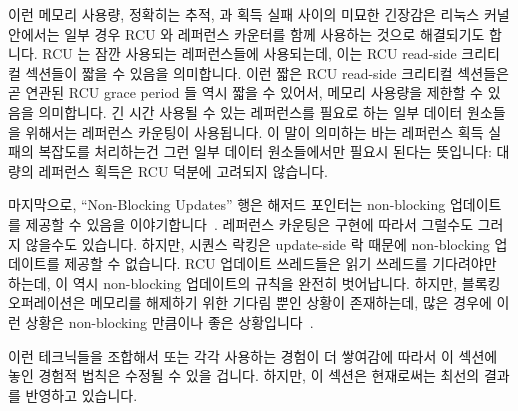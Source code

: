 이런 메모리 사용량, 정확히는 추적, 과 획득 실패 사이의 미묘한 긴장감은 리눅스
커널 안에서는 일부 경우 RCU 와 레퍼런스 카운터를 함께 사용하는 것으로
해결되기도 합니다.
RCU 는 잠깐 사용되는 레퍼런스들에 사용되는데, 이는 RCU read-side 크리티컬
섹션들이 짧을 수 있음을 의미합니다.
이런 짧은 RCU read-side 크리티컬 섹션들은 곧 연관된 RCU grace period 들 역시
짧을 수 있어서, 메모리 사용량을 제한할 수 있음을 의미합니다.
긴 시간 사용될 수 있는 레퍼런스를 필요로 하는 일부 데이터 원소들을 위해서는
레퍼런스 카운팅이 사용됩니다.
이 말이 의미하는 바는 레퍼런스 획득 실패의 복잡도를 처리하는건 그런 일부 데이터
원소들에서만 필요시 된다는 뜻입니다:  대량의 레퍼런스 획득은 RCU 덕분에
고려되지 않습니다.
\iffalse

This tension between memory footprint, precise tracking, and acquisition
failures is sometimes resolved within the Linux kernel by combining use
of RCU and reference counters.
RCU is used for short-lived references, which means that RCU read-side
critical sections can be short.
These short RCU read-side critical sections in turn mean that the corresponding
RCU grace periods can also be short, limiting the memory footprint.
For the few data elements that need longer-lived references, reference
counting is used.
This means that the complexity of reference-acquisition failure only
needs to be dealt with for those few data elements:  The bulk of
the reference acquisitions are unconditional, courtesy of RCU.
\fi

마지막으로, ``Non-Blocking Updates'' 행은 해저드 포인터는 non-blocking
업데이트를 제공할 수 있음을 이야기합니다~\cite{MagedMichael04a,HerlihyLM02}.
레퍼런스 카운팅은 구현에 따라서 그럴수도 그러지 않을수도 있습니다.
하지만, 시퀀스 락킹은 update-side 락 때문에 non-blocking 업데이트를 제공할 수
없습니다.
RCU 업데이트 쓰레드들은 읽기 쓰레드를 기다려야만 하는데, 이 역시 non-blocking
업데이트의 규칙을 완전히 벗어납니다.
하지만, 블록킹 오퍼레이션은 메모리를 해제하기 위한 기다림 뿐인 상황이
존재하는데, 많은 경우에 이런 상황은 non-blocking 만큼이나 좋은
상황입니다~\cite{MathieuDesnoyers2012URCU}.

이런 테크닉들을 조합해서 또는 각각 사용하는 경험이 더 쌓여감에 따라서 이 섹션에
놓인 경험적 법칙은 수정될 수 있을 겁니다.
하지만, 이 섹션은 현재로써는 최선의 결과를 반영하고 있습니다.
\iffalse

Finally, the ``Non-Blocking Updates'' column shows that hazard pointers
can provide non-blocking updates~\cite{MagedMichael04a,HerlihyLM02}.
Reference counting might or might not, depending on the implementation.
However, sequence locking cannot provide non-blocking updates, courtesy
of its update-side lock.
RCU updaters must wait on readers, which also rules out fully non-blocking
updates.
However, there are situations in which the only blocking operation is
a wait to free memory, which results in an situation that, for many
purposes, is as good as non-blocking~\cite{MathieuDesnoyers2012URCU}.

As more experience is gained using these techniques, both separately
and in combination, the rules of thumb laid out in this section will
need to be refined.
However, this section does reflect the current state of the art.
\fi
